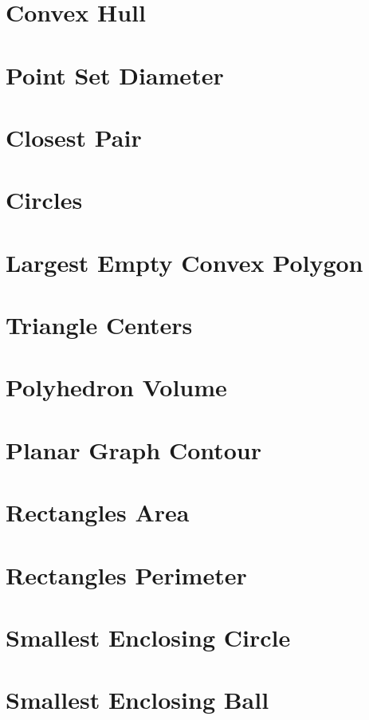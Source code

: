 \documentclass{report}
\begin{document}
\begin{CJK*}{GBK}{kai}
\section{Convex Hull}
 \label{convex}
\section{Point Set Diameter}

\clearpage
\section{Closest Pair}

\section{Circles}

\clearpage
\section{Largest Empty Convex Polygon}

\clearpage
\section{Triangle Centers}

\clearpage
\section{Polyhedron Volume}

\clearpage
\section{Planar Graph Contour}

\clearpage
\section{Rectangles Area}

\clearpage
\section{Rectangles Perimeter}

\clearpage
\section{Smallest Enclosing Circle}

\clearpage
\section{Smallest Enclosing Ball}




\end{CJK*}
\end{document}

